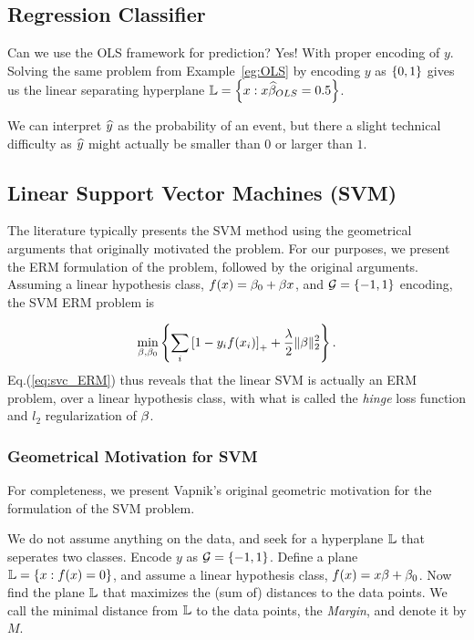 \subsection{Regression Classifier}
\label{sec:regression_classifier}
Can we use the OLS framework for prediction? Yes! With proper encoding of $y$.
Solving the same problem from Example~\ref{eg:OLS} by encoding $y$ as $\left\{ 0,1 \right\}$ gives us the linear separating hyperplane $\mathbb{L}= \left\{ x:x\widehat{\beta}_{OLS}=0.5 \right\}$.

\begin{remark}
We can interpret $\widehat{y}$ as the probability of an event, but there a slight technical difficulty as $\widehat{y}$ might actually be smaller than $0$ or larger than $1$.
\end{remark}




\subsection{Linear Support Vector Machines (SVM)}
\label{sec:svm}

The literature typically presents the SVM method using the geometrical arguments that originally motivated the problem. 
For our purposes, we present the ERM formulation of the problem, followed by the original arguments.
Assuming a linear hypothesis class, $f(x)=\beta_0+\beta x$, and $\mathcal{G}=\left\{ -1,1 \right\}$ encoding, the SVM ERM problem is

\begin{align}
\label{eq:svc_ERM}
	\min_{\beta,\beta_0} \left\{ 
		\sum_i \left[ 1-y_i f(x_i) \right]_+ +\frac{\lambda}{2} \Vert \beta \Vert_2^2
	 \right\}.
\end{align}
Eq.(\ref{eq:svc_ERM}) thus reveals that the linear SVM is actually an ERM problem, over a linear hypothesis class, with what is called the \emph{hinge} loss function and $l_2$ regularization of $\beta$.


\subsubsection{Geometrical Motivation for SVM}
For completeness, we present Vapnik's original geometric motivation \citep{vapnik_statistical_1998} for the formulation of the SVM problem. 

We do not assume anything on the data, and seek for a hyperplane $\mathbb{L}$ that seperates two classes. 
Encode $y$ as $\mathcal{G}=\left\{ -1,1 \right\}$.
Define a plane $\mathbb{L}=\left\{ x: f(x)=0  \right\}$, and assume a linear hypothesis class, $f(x)=x\beta+\beta_0$.
Now find the plane $\mathbb{L}$ that maximizes the (sum of) distances to the data points.
We call the minimal distance from $\mathbb{L}$ to the data points, the \emph{Margin}, and denote it by $M$.

